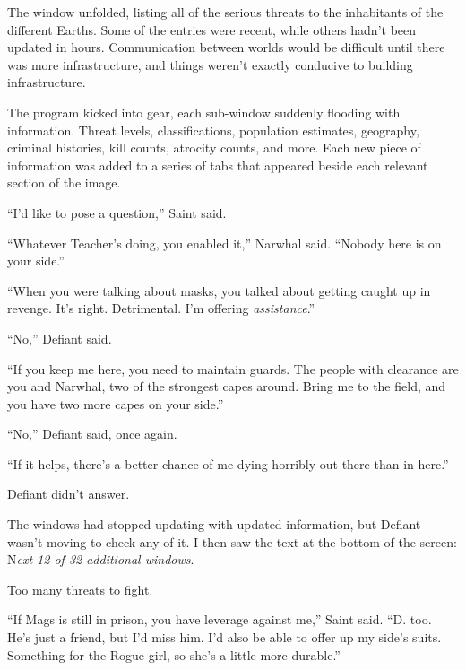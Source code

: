 The window unfolded, listing all of the serious threats to the inhabitants of the different Earths. Some of the entries were recent, while others hadn't been updated in hours.  Communication between worlds would be difficult until there was more infrastructure, and things weren't exactly conducive to building infrastructure.



The program kicked into gear, each sub-window suddenly flooding with information.  Threat levels, classifications, population estimates, geography, criminal histories, kill counts, atrocity counts, and more.  Each new piece of information was added to a series of tabs that appeared beside each relevant section of the image.



``I'd like to pose a question,'' Saint said.



``Whatever Teacher's doing, you enabled it,'' Narwhal said.  ``Nobody here is on your side.''



``When you were talking about masks, you talked about getting caught up in revenge.  It's right.  Detrimental.  I'm offering \emph{assistance}.''



``No,'' Defiant said.



``If you keep me here, you need to maintain guards.  The people with clearance are you and Narwhal, two of the strongest capes around.  Bring me to the field, and you have two more capes on your side.''



``No,'' Defiant said, once again.



``If it helps, there's a better chance of me dying horribly out there than in here.''



Defiant didn't answer.



The windows had stopped updating with updated information, but Defiant wasn't moving to check any of it.  I then saw the text at the bottom of the screen: N\emph{ext 12 of 32 additional windows}.



Too many threats to fight.



``If Mags is still in prison, you have leverage against me,'' Saint said.  ``D. too.  He's just a friend, but I'd miss him.  I'd also be able to offer up my side's suits.  Something for the Rogue girl, so she's a little more durable.''



